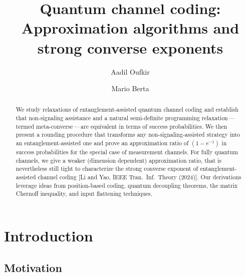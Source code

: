 \documentclass[a4paper,onecolumn,11pt,accepted=2025-10-01]{quantumarticle}
\begin{document}
\title{Quantum channel coding:
 Approximation algorithms and strong converse exponents}

\author{Aadil Oufkir}
\author{Mario Berta}
\maketitle

\begin{abstract}
   We study relaxations of entanglement-assisted quantum channel coding and establish that non-signaling assistance and a natural semi-definite programming relaxation\,---\,termed meta-converse\,---\,are equivalent in terms of success probabilities. We then present a rounding procedure that transforms any non-signaling-assisted strategy into an entanglement-assisted one and prove an approximation ratio of $(1 - e^{-1})$ in success probabilities for the special case of measurement channels. For fully quantum channels, we give a weaker (dimension dependent) approximation ratio, that is nevertheless still tight to characterize the strong converse exponent of entanglement-assisted channel coding [Li and Yao, IEEE Tran.~Inf.~Theory (2024)]. Our derivations leverage ideas from position-based coding, quantum decoupling theorems, the matrix Chernoff inequality, and input flattening techniques.
\end{abstract}

\section{Introduction}

\subsection{Motivation}
\end{document}
